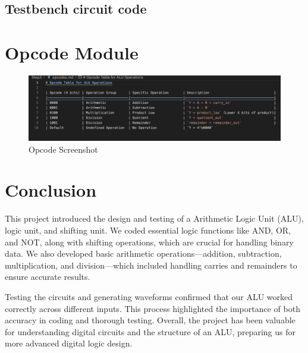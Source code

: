 \documentclass[12pt]{article}
\begin{document}
\subsection{Testbench circuit code}


\section{Opcode Module}
\begin{figure}[H]
    \centering 
   \includegraphics[width = 1.0\textwidth]{pictures/Opcode.png}
    \caption{Opcode Screenshot}
    \label{fig:enter-label}
    \end{figure}

\section{Conclusion}

This project introduced the design and testing of a Arithmetic Logic Unit (ALU), logic unit, and shifting unit. We coded essential logic functions like AND, OR, and NOT, along with shifting operations, which are crucial for handling binary data. We also developed basic arithmetic operations—addition, subtraction, multiplication, and division—which included handling carries and remainders to ensure accurate results.

Testing the circuits and generating waveforms confirmed that our ALU worked correctly across different inputs. This process highlighted the importance of both accuracy in coding and thorough testing. Overall, the project has been valuable for understanding digital circuits and the structure of an ALU, preparing us for more advanced digital logic design.
\end{document}
